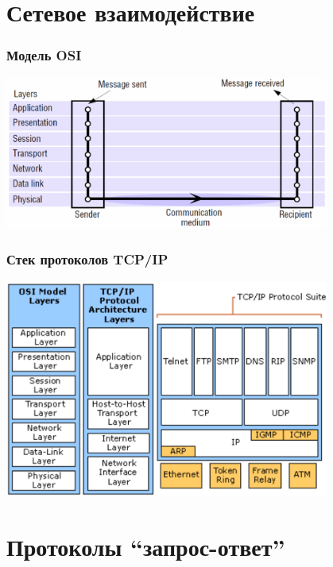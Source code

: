 \documentclass[xetex,mathserif,serif]{beamer}
\begin{document}
	\section{Сетевое взаимодействие}

	\begin{frame}
		\frametitle{Модель OSI}
		\begin{center}
			\includegraphics[width=0.8\textwidth]{osiStack.png}
		\end{center}
	\end{frame}

	\begin{frame}
		\frametitle{Стек протоколов TCP/IP}
		\begin{center}
			\includegraphics[width=0.8\textwidth]{tcpIpStack.png}
		\end{center}
	\end{frame}

	\section{Протоколы ``запрос-ответ''}
\end{document}
